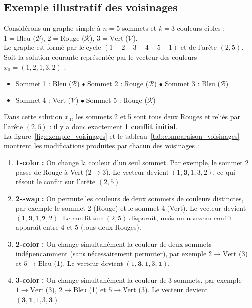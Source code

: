 \documentclass{article}
\begin{document}
\subsection{Exemple illustratif des voisinages}
Considérons un graphe simple à $n = 5$ sommets et $k = 3$ couleurs cibles : $1 = \text{Bleu}$ ($\mathcal{B}$), $2 = \text{Rouge}$ ($\mathcal{R}$), $3 = \text{Vert}$ ($\mathcal{V}$).\\
Le graphe est formé par le cycle $(1-2-3-4-5-1)$ et de l'arête $(2, 5)$.\\

Soit la solution courante représentée par le vecteur des couleurs $x_0 = (1, 2, 1, 3, 2)$ :
\begin{itemize}
    \item Sommet 1 : Bleu ($\mathcal{B}$) \quad $\bullet$ Sommet 2 : Rouge ($\mathcal{R}$) \quad $\bullet$ Sommet 3 : Bleu ($\mathcal{B}$)
    \item Sommet 4 : Vert ($\mathcal{V}$) \quad $\bullet$ Sommet 5 : Rouge ($\mathcal{R}$) \\
\end{itemize}

Dans cette solution $x_0$, les sommets 2 et 5 sont tous deux Rouges et reliés par l'arête $(2, 5)$ : il y a donc exactement \textbf{1 conflit initial}.\\

La figure~\ref{fig:exemple_voisinages} et le tableau~\ref{tab:comparaison_voisinages} montrent les modifications produites par chacun des voisinages :
\begin{enumerate}
    \item \textbf{1-color :} On change la couleur d'un seul sommet. Par exemple, le sommet 2 passe de Rouge à Vert ($2 \to 3$). Le vecteur devient $(1, \mathbf{3}, 1, 3, 2)$, ce qui résout le conflit sur l'arête $(2, 5)$.
    \item \textbf{2-swap :} On permute les couleurs de deux sommets de couleurs distinctes, par exemple le sommet 2 (Rouge) et le sommet 4 (Vert). Le vecteur devient $(1, \mathbf{3}, 1, \mathbf{2}, 2)$. Le conflit sur $(2,5)$ disparaît, mais un nouveau conflit apparaît entre 4 et 5 (tous deux Rouges).
    \item \textbf{2-color :} On change simultanément la couleur de deux sommets indépendamment (sans nécessairement permuter), par exemple $2 \to \text{Vert}$ (3) et $5 \to \text{Bleu}$ (1). Le vecteur devient $(1, \mathbf{3}, 1, 3, \mathbf{1})$.
    \item \textbf{3-color :} On change simultanément la couleur de 3 sommets, par exemple $1 \to \text{Vert}$ (3), $2 \to \text{Bleu}$ (1) et $5 \to \text{Vert}$ (3). Le vecteur devient $(\mathbf{3}, \mathbf{1}, 1, 3, \mathbf{3})$.
\end{enumerate}
\end{document}
